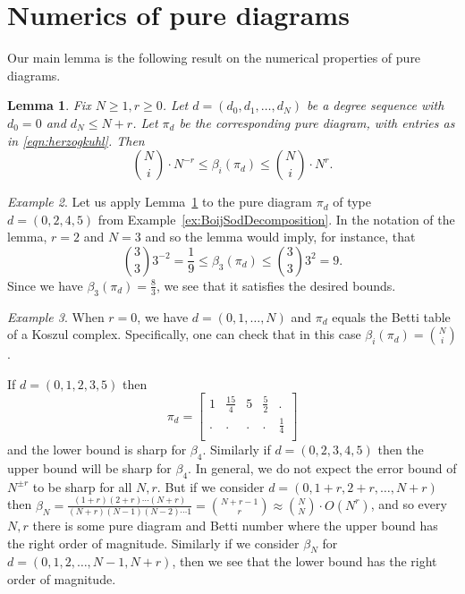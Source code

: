 \documentclass[12pt]{amsart}
\newtheorem{lemma}{Lemma}[section]
\theoremstyle{remark}
\newtheorem{example}[lemma]{Example}
\begin{document}
\section{Numerics of pure diagrams}\label{sec:KeyLemma}
Our main lemma is the following result on the numerical properties of pure diagrams.
\begin{lemma}\label{keyLemma}
Fix $N\geq 1,r\geq 0$.  Let $d=(d_0, d_1, \dots, d_N)$ be a degree sequence with $d_0=0$ and $d_N \leq N+r$.   Let $\pi_d$ be the corresponding pure diagram, with entries as in \eqref{eqn:herzogkuhl}.  Then
\[
 \binom{N}{i}\cdot N^{-r} \leq \beta_i(\pi_d)  \leq \binom{N}{i} \cdot N^r.
\]
\end{lemma}

\begin{example}
Let us apply Lemma~\ref{keyLemma} to the pure diagram $\pi_d$ of type $d=(0,2,4,5)$ from Example~\ref{ex:BoijSodDecomposition}.   In the notation of the lemma, $r=2$ and $N=3$ and so the lemma would imply, for instance, that
\[
\binom{3}{3} 3^{-2} = \frac{1}{9} \leq \beta_3(\pi_d) \leq \binom{3}{3} 3^2=9.
\]
Since we have $\beta_3(\pi_d) = \frac{8}{3}$, we see that it satisfies the desired bounds.
\end{example}
\begin{example}
When $r=0$, we have $d=(0,1,\dots,N)$ and $\pi_d$ equals the Betti table of a Koszul complex.  Specifically, one can check that in this case $\beta_i(\pi_d)=\binom{N}{i}$.
\end{example}

If $d=(0,1,2,3,5)$ then
\[
\pi_d = \begin{bmatrix}
1& \frac{15}{4} & 5 & \frac{5}{2}& .\\
 . & . & . & .&\frac{1}{4}\\
 \end{bmatrix}
\]
and the lower bound is sharp for $\beta_4$.  Similarly if $d=(0,2,3,4,5)$ then the upper bound will be sharp for $\beta_4$.  In general, we do not expect the error bound of $N^{\pm r}$ to be sharp for all $N,r$.  But if we consider $d=(0,1+r,2+r, \dots, N+r)$  then $\beta_N = \frac{(1+r)(2+r)\cdots (N+r)}{(N+r)(N-1)(N-2)\cdots 1} = \binom{N+r-1}{r} \approx \binom{N}{N} \cdot O(N^r)$, and so every $N,r$ there is some pure diagram and Betti number where the upper bound has the right order of magnitude.  Similarly if we consider $\beta_N$ for $d=(0,1,2,\dots,N-1,N+r)$, then we see that the lower bound has the right order of magnitude.
\end{document}
